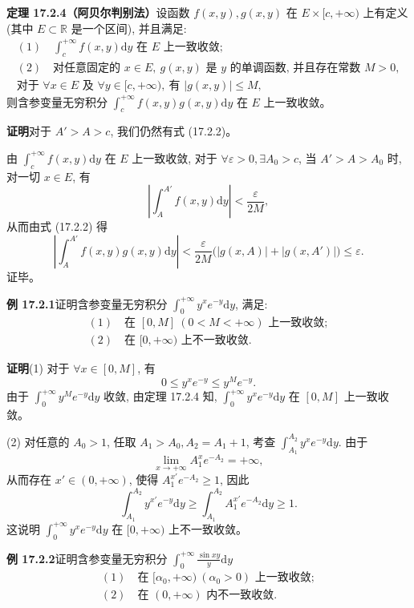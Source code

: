 \documentclass[UTF8,12pt,a4paper,fontset=fandol]{ctexart}
\begin{document}
\noindent\textbf{定理 17.2.4（阿贝尔判别法）}\quad 设函数 $f(x,y),g(x,y)$ 在 $E\times[c,+\infty)$ 上有定义 (其中 $E\subset\mathbb R$ 是一个区间), 并且满足:
\[
\begin{gathered}
  (1)\quad \int_c^{+\infty}f(x,y)\mathrm dy \text{ 在 } E \text{ 上一致收敛};\\
  (2)\quad \text{对任意固定的 } x\in E,\ g(x,y) \text{ 是 } y \text{ 的单调函数, 并且存在常数 } M>0,\\
  \text{对于 } \forall x\in E \text{ 及 } \forall y\in[c,+\infty),\ \text{有 } |g(x,y)|\leqslant M,
\end{gathered}
\]
则含参变量无穷积分 $\int_c^{+\infty}f(x,y)g(x,y)\mathrm dy$ 在 $E$ 上一致收敛。

\noindent\textbf{证明}\quad 对于 $A'>A>c$, 我们仍然有式 (17.2.2)。

由 $\int_c^{+\infty}f(x,y)\mathrm dy$ 在 $E$ 上一致收敛, 对于 $\forall\varepsilon>0,\exists A_0>c$, 当 $A'>A>A_0$ 时, 对一切 $x\in E$, 有
\[
  \left|\int_A^{A'}f(x,y)\mathrm dy\right|<\frac{\varepsilon}{2M},
\]
从而由式 (17.2.2) 得
\[
  \left|\int_A^{A'}f(x,y)g(x,y)\mathrm dy\right|
  <\frac{\varepsilon}{2M}\bigl(|g(x,A)|+|g(x,A')|\bigr)\leqslant\varepsilon.
\]
证毕。

\noindent\textbf{例 17.2.1}\quad 证明含参变量无穷积分 $\int_0^{+\infty}y^xe^{-y}\mathrm dy$, 满足:
\[
\begin{gathered}
  (1)\quad \text{在 } [0,M]\ (0<M<+\infty) \text{ 上一致收敛};\\
  (2)\quad \text{在 } [0,+\infty) \text{ 上不一致收敛}.
\end{gathered}
\]

\noindent\textbf{证明}\quad (1) 对于 $\forall x\in[0,M]$, 有
\[
  0\leqslant y^xe^{-y}\leqslant y^M e^{-y}.
\]
由于 $\int_0^{+\infty}y^M e^{-y}\mathrm dy$ 收敛, 由定理 17.2.4 知, $\int_0^{+\infty}y^xe^{-y}\mathrm dy$ 在 $[0,M]$ 上一致收敛。

(2) 对任意的 $A_0>1$, 任取 $A_1>A_0,A_2=A_1+1$, 考查 $\int_{A_1}^{A_2}y^xe^{-y}\mathrm dy$. 由于
\[
  \lim_{x\to+\infty}A_1^x e^{-A_2}=+\infty,
\]
从而存在 $x'\in(0,+\infty)$, 使得 $A_1^{x'}e^{-A_2}\geqslant1$, 因此
\[
  \int_{A_1}^{A_2}y^{x'}e^{-y}\mathrm dy
  \geqslant \int_{A_1}^{A_2}A_1^{x'}e^{-A_2}\mathrm dy\geqslant1.
\]
这说明 $\int_0^{+\infty}y^xe^{-y}\mathrm dy$ 在 $[0,+\infty)$ 上不一致收敛。

\noindent\textbf{例 17.2.2}\quad 证明含参变量无穷积分 $\int_0^{+\infty}\frac{\sin xy}{y}\mathrm dy$
\[
\begin{gathered}
  (1)\quad \text{在 } [\alpha_0,+\infty)\ (\alpha_0>0) \text{ 上一致收敛};\\
  (2)\quad \text{在 } (0,+\infty) \text{ 内不一致收敛}.
\end{gathered}
\]
\end{document}
